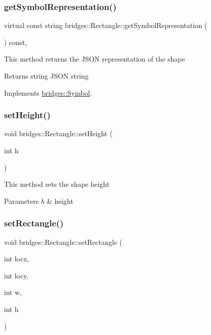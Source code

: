 \subsubsection{\texorpdfstring{get\+Symbol\+Representation()}{getSymbolRepresentation()}}
{\footnotesize\ttfamily virtual const string bridges\+::\+Rectangle\+::get\+Symbol\+Representation (\begin{DoxyParamCaption}{ }\end{DoxyParamCaption}) const\hspace{0.3cm}{\ttfamily [inline]}, {\ttfamily [virtual]}}

This method returns the J\+S\+ON representation of the shape

\begin{DoxyReturn}{Returns}
string J\+S\+ON string 
\end{DoxyReturn}


Implements \mbox{\hyperlink{classbridges_1_1_symbol_ab4dd31fbc736b2e58e8b8bb8446eac73}{bridges\+::\+Symbol}}.

\mbox{\label{classbridges_1_1_rectangle_aa14d6619e60de1d660fa6f3770dfaaa7}} 
\subsubsection{\texorpdfstring{set\+Height()}{setHeight()}}
{\footnotesize\ttfamily void bridges\+::\+Rectangle\+::set\+Height (\begin{DoxyParamCaption}\item[{int}]{h }\end{DoxyParamCaption})\hspace{0.3cm}{\ttfamily [inline]}}

This method sets the shape height


\begin{DoxyParams}{Parameters}
{\em h} & height \\
\hline
\end{DoxyParams}
\mbox{\label{classbridges_1_1_rectangle_aee11bd9b9601d54c652b5b225c75bbac}} 
\subsubsection{\texorpdfstring{set\+Rectangle()}{setRectangle()}}
{\footnotesize\ttfamily void bridges\+::\+Rectangle\+::set\+Rectangle (\begin{DoxyParamCaption}\item[{int}]{locx,  }\item[{int}]{locy,  }\item[{int}]{w,  }\item[{int}]{h }\end{DoxyParamCaption})\hspace{0.3cm}{\ttfamily [inline]}}

